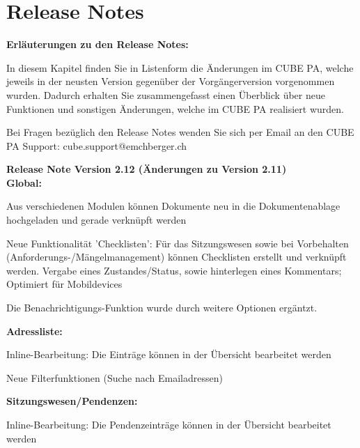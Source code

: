 
\clearpage
\section{Release Notes}

\textbf{Erläuterungen zu den Release Notes:}

\vspace{\baselineskip}

In diesem Kapitel finden Sie in Listenform die Änderungen im CUBE PA, welche jeweils in der neusten Version gegenüber der Vorgängerversion vorgenommen wurden. Dadurch erhalten Sie zusammengefasst einen Überblick über neue Funktionen und sonstigen Änderungen, welche im CUBE PA realisiert wurden.

\vspace{\baselineskip}

Bei Fragen bezüglich den Release Notes wenden Sie sich per Email an den CUBE PA Support: {\color{red} cube.support@emchberger.ch}


\vspace{\baselineskip}

\textbf{Release Note Version 2.12 (Änderungen zu Version 2.11)} \\

\textbf{Global:}
\begin{compactitem}
	\item Aus verschiedenen Modulen können Dokumente neu in die Dokumentenablage hochgeladen und gerade verknüpft werden
	\item Neue Funktionalität 'Checklisten': Für das Sitzungswesen sowie bei Vorbehalten (Anforderungs-/Mängelmanagement) können Checklisten erstellt und verknüpft werden. Vergabe eines Zustandes/Status, sowie hinterlegen eines Kommentars; Optimiert für Mobildevices
	\item Die Benachrichtigungs-Funktion wurde durch weitere Optionen ergäntzt.
\end{compactitem}

\textbf{Adressliste:}
\begin{compactitem}
	\item Inline-Bearbeitung: Die Einträge können in der Übersicht bearbeitet werden
	\item Neue Filterfunktionen (Suche nach Emailadressen)
\end{compactitem}

\textbf{Sitzungswesen/Pendenzen:}
\begin{compactitem}
	\item Inline-Bearbeitung: Die Pendenzeinträge können in der Übersicht bearbeitet werden
\end{compactitem}

